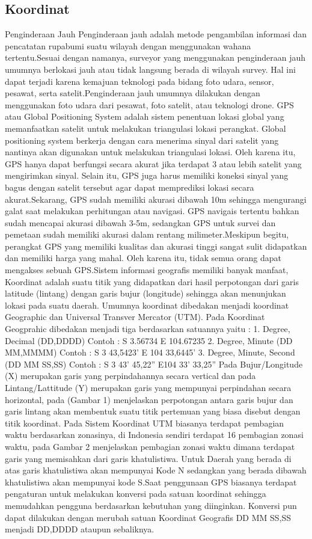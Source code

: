 \subsection{Koordinat}
Penginderaan Jauh
Penginderaan jauh adalah metode pengambilan informasi dan pencatatan rupabumi suatu wilayah dengan menggunakan wahana tertentu.Sesuai dengan namanya, surveyor yang menggunakan penginderaan jauh umumnya berlokasi jauh atau tidak langsung berada di wilayah survey. Hal ini dapat terjadi karena kemajuan teknologi pada bidang foto udara, sensor, pesawat, serta satelit.Penginderaan jauh umumnya dilakukan dengan menggunakan foto udara dari pesawat, foto satelit, atau teknologi drone.
GPS atau Global Positioning System adalah sistem penentuan lokasi global yang memanfaatkan satelit untuk melakukan triangulasi lokasi perangkat.
Global positioning system berkerja dengan cara menerima sinyal dari satelit yang nantinya akan digunakan untuk melakukan triangulasi lokasi. Oleh karena itu, GPS hanya dapat berfungsi secara akurat jika terdapat 3 atau lebih satelit yang mengirimkan sinyal.
Selain itu, GPS juga harus memiliki koneksi sinyal yang bagus dengan satelit tersebut agar dapat memprediksi lokasi secara akurat.Sekarang, GPS sudah memiliki akurasi dibawah 10m sehingga mengurangi galat saat melakukan perhitungan atau navigasi. GPS navigais tertentu bahkan sudah mencapai akurasi dibawah 3-5m, sedangkan GPS untuk survei dan pemetaan sudah memiliki akurasi dalam rentang milimeter.Meskipun begitu, perangkat GPS yang memiliki kualitas dan akurasi tinggi sangat sulit didapatkan dan memiliki harga yang mahal. Oleh karena itu, tidak semua orang dapat mengakses sebuah GPS.Sistem informasi geografis memiliki banyak manfaat, 
Koordinat adalah suatu titik yang didapatkan dari hasil perpotongan dari garis latitude (lintang) dengan garis bujur (longitude) sehingga akan menunjukan lokasi pada suatu daerah. Umumnya koordinat dibedakan menjadi koordinat Geographic dan Universal Transver Mercator (UTM). Pada Koordinat Geogprahic dibedakan menjadi tiga berdasarkan satuannya yaitu :
1.	Degree, Decimal (DD,DDDD) Contoh : S 3.56734 E 104.67235
2.	Degree, Minute (DD MM,MMMM) Contoh : S 3 43,5423' E 104 33,6445'
3.	Degree, Minute, Second (DD MM SS,SS) Contoh : S 3 43' 45,22'' E104 33' 33,25''
Pada Bujur/Longitude (X) merupakan garis yang perpindahannya secara vertical dan pada Lintang/Lattitude (Y) merupakan garis yang mempunyai perpindahan secara horizontal, pada (Gambar 1) menjelaskan perpotongan antara garis bujur dan garis lintang akan membentuk suatu titik pertemuan yang biasa disebut dengan titik koordinat. Pada Sistem Koordinat UTM biasanya terdapat pembagian waktu berdasarkan zonasinya, di Indonesia sendiri terdapat 16 pembagian zonasi waktu, pada Gambar 2 menjelaskan pembagian zonasi waktu dimana terdapat garis yang memisahkan dari garis khatulistiwa. Untuk Daerah yang berada di atas garis khatulistiwa akan mempunyai Kode N sedangkan yang berada dibawah khatulistiwa akan mempunyai kode S.Saat penggunaan GPS biasanya terdapat pengaturan untuk melakukan konversi pada satuan koordinat sehingga memudahkan pengguna berdasarkan kebutuhan yang diinginkan. Konversi pun dapat dilakukan dengan merubah satuan Koordinat Geografis DD MM SS,SS menjadi DD,DDDD ataupun sebaliknya.

